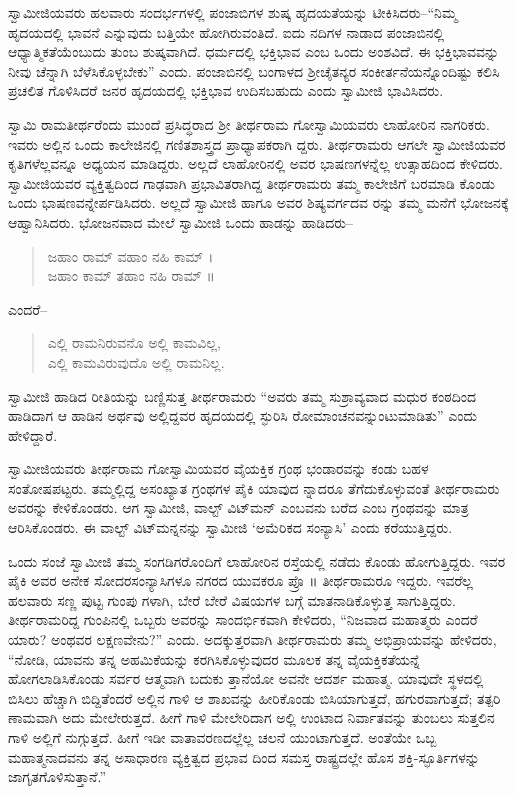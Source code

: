 ಸ್ವಾಮೀಜಿಯವರು ಹಲವಾರು ಸಂದರ್ಭಗಳಲ್ಲಿ ಪಂಜಾಬಿಗಳ ಶುಷ್ಕ ಹೃದಯತೆಯನ್ನು ಟೀಕಿಸಿದರು–“ನಿಮ್ಮ ಹೃದಯದಲ್ಲಿ ಭಾವನೆ ಎನ್ನುವುದು ಬತ್ತಿಯೇ ಹೋಗಿರುವಂತಿದೆ. ಐದು ನದಿಗಳ ನಾಡಾದ ಪಂಜಾಬಿನಲ್ಲಿ ಆಧ್ಯಾತ್ಮಿಕತೆಯೆಂಬುದು ತುಂಬ ಶುಷ್ಕವಾಗಿದೆ. ಧರ್ಮದಲ್ಲಿ ಭಕ್ತಿಭಾವ ಎಂಬ ಒಂದು ಅಂಶವಿದೆ. ಈ ಭಕ್ತಿಭಾವವನ್ನು ನೀವು ಚೆನ್ನಾಗಿ ಬೆಳೆಸಿಕೊಳ್ಳಬೇಕು” ಎಂದು. ಪಂಜಾಬಿನಲ್ಲಿ ಬಂಗಾಳದ ಶ್ರೀಚೈತನ್ಯರ ಸಂಕೀರ್ತನೆಯನ್ನೊಂದಿಷ್ಟು ಕಲಿಸಿ ಪ್ರಚಲಿತ ಗೊಳಿಸಿದರೆ ಜನರ ಹೃದಯದಲ್ಲಿ ಭಕ್ತಿಭಾವ ಉದಿಸಬಹುದು ಎಂದು ಸ್ವಾಮೀಜಿ ಭಾವಿಸಿದರು.

ಸ್ವಾಮಿ ರಾಮತೀರ್ಥರೆಂದು ಮುಂದೆ ಪ್ರಸಿದ್ಧರಾದ ಶ್ರೀ ತೀರ್ಥರಾಮ ಗೋಸ್ವಾಮಿಯವರು ಲಾಹೋರಿನ ನಾಗರಿಕರು. ಇವರು ಅಲ್ಲಿನ ಒಂದು ಕಾಲೇಜಿನಲ್ಲಿ ಗಣಿತಶಾಸ್ತ್ರದ ಪ್ರಾಧ್ಯಾಪಕರಾಗಿ ದ್ದರು. ತೀರ್ಥರಾಮರು ಆಗಲೇ ಸ್ವಾಮೀಜಿಯವರ ಕೃತಿಗಳೆಲ್ಲವನ್ನೂ ಅಧ್ಯಯನ ಮಾಡಿದ್ದರು. ಅಲ್ಲದೆ ಲಾಹೋರಿನಲ್ಲಿ ಅವರ ಭಾಷಣಗಳನ್ನೆಲ್ಲ ಉತ್ಸಾಹದಿಂದ ಕೇಳಿದರು. ಸ್ವಾಮೀಜಿಯವರ ವ್ಯಕ್ತಿತ್ವದಿಂದ ಗಾಢವಾಗಿ ಪ್ರಭಾವಿತರಾಗಿದ್ದ ತೀರ್ಥರಾಮರು ತಮ್ಮ ಕಾಲೇಜಿಗೆ ಬರಮಾಡಿ ಕೊಂಡು ಒಂದು ಭಾಷಣವನ್ನೇರ್ಪಡಿಸಿದರು. ಅಲ್ಲದೆ ಸ್ವಾಮೀಜಿ ಹಾಗೂ ಅವರ ಶಿಷ್ಯವರ್ಗದವ ರನ್ನು ತಮ್ಮ ಮನೆಗೆ ಭೋಜನಕ್ಕೆ ಆಹ್ವಾನಿಸಿದರು. ಭೋಜನವಾದ ಮೇಲೆ ಸ್ವಾಮೀಜಿ ಒಂದು ಹಾಡನ್ನು ಹಾಡಿದರು–

\begin{verse}
ಜಹಾಂ ರಾಮ್ ವಹಾಂ ನಹಿ ಕಾಮ್ ।\\ಜಹಾಂ ಕಾಮ್ ತಹಾಂ ನಹಿ ರಾಮ್ ॥
\end{verse}

\noindent

ಎಂದರೆ–

\begin{verse}
ಎಲ್ಲಿ ರಾಮನಿರುವನೊ ಅಲ್ಲಿ ಕಾಮವಿಲ್ಲ,\\ಎಲ್ಲಿ ಕಾಮವಿರುವುದೊ ಅಲ್ಲಿ ರಾಮನಿಲ್ಲ.
\end{verse}

ಸ್ವಾಮೀಜಿ ಹಾಡಿದ ರೀತಿಯನ್ನು ಬಣ್ಣಿಸುತ್ತ ತೀರ್ಥರಾಮರು “ಅವರು ತಮ್ಮ ಸುಶ್ರಾವ್ಯವಾದ ಮಧುರ ಕಂಠದಿಂದ ಹಾಡಿದಾಗ ಆ ಹಾಡಿನ ಅರ್ಥವು ಅಲ್ಲಿದ್ದವರ ಹೃದಯದಲ್ಲಿ ಸ್ಫುರಿಸಿ ರೋಮಾಂಚನವನ್ನುಂಟುಮಾಡಿತು” ಎಂದು ಹೇಳಿದ್ದಾರೆ.

ಸ್ವಾಮೀಜಿಯವರು ತೀರ್ಥರಾಮ ಗೋಸ್ವಾಮಿಯವರ ವೈಯಕ್ತಿಕ ಗ್ರಂಥ ಭಂಡಾರವನ್ನು ಕಂಡು ಬಹಳ ಸಂತೋಷಪಟ್ಟರು. ತಮ್ಮಲ್ಲಿದ್ದ ಅಸಂಖ್ಯಾತ ಗ್ರಂಥಗಳ ಪೈಕಿ ಯಾವುದ ನ್ನಾದರೂ ತೆಗೆದುಕೊಳ್ಳುವಂತೆ ತೀರ್ಥರಾಮರು ಅವರನ್ನು ಕೇಳಿಕೊಂಡರು. ಆಗ ಸ್ವಾಮೀಜಿ, ವಾಲ್ಟ್ ವಿಟ್​ಮನ್ ಎಂಬವನು ಬರೆದ  ಎಂಬ ಗ್ರಂಥವನ್ನು ಮಾತ್ರ ಆರಿಸಿಕೊಂಡರು. ಈ ವಾಲ್ಟ್ ವಿಟ್​ಮನ್ನನನ್ನು ಸ್ವಾಮೀಜಿ ‘ಅಮೆರಿಕದ ಸಂನ್ಯಾಸಿ’ ಎಂದು ಕರೆಯುತ್ತಿದ್ದರು.

ಒಂದು ಸಂಜೆ ಸ್ವಾಮೀಜಿ ತಮ್ಮ ಸಂಗಡಿಗರೊಂದಿಗೆ ಲಾಹೋರಿನ ರಸ್ತೆಯಲ್ಲಿ ನಡೆದು ಕೊಂಡು ಹೋಗುತ್ತಿದ್ದರು. ಇವರ ಪೈಕಿ ಅವರ ಅನೇಕ ಸೋದರಸಂನ್ಯಾಸಿಗಳೂ ನಗರದ ಯುವಕರೂ ಪ್ರೊ ॥ ತೀರ್ಥರಾಮರೂ ಇದ್ದರು. ಇವರೆಲ್ಲ ಹಲವಾರು ಸಣ್ಣ ಪುಟ್ಟ ಗುಂಪು ಗಳಾಗಿ, ಬೇರೆ ಬೇರೆ ವಿಷಯಗಳ ಬಗ್ಗೆ ಮಾತನಾಡಿಕೊಳ್ಳುತ್ತ ಸಾಗುತ್ತಿದ್ದರು. ತೀರ್ಥರಾಮರಿದ್ದ ಗುಂಪಿನಲ್ಲಿ ಒಬ್ಬರು ಅವರನ್ನು ಸಾಂದರ್ಭಿಕವಾಗಿ ಕೇಳಿದರು, “ನಿಜವಾದ ಮಹಾತ್ಮರು ಎಂದರೆ ಯಾರು? ಅಂಥವರ ಲಕ್ಷಣವೇನು?” ಎಂದು. ಅದಕ್ಕುತ್ತರವಾಗಿ ತೀರ್ಥರಾಮರು ತಮ್ಮ ಅಭಿಪ್ರಾಯವನ್ನು ಹೇಳಿದರು, “ನೋಡಿ, ಯಾವನು ತನ್ನ ಅಹಮಿಕೆಯನ್ನು ಕರಗಿಸಿಕೊಳ್ಳುವುದರ ಮೂಲಕ ತನ್ನ ವೈಯಕ್ತಿಕತೆಯನ್ನೆ ಹೋಗಲಾಡಿಸಿಕೊಂಡು ಸರ್ವರ ಆತ್ಮವಾಗಿ ಬದುಕು ತ್ತಾನೆಯೋ ಅವನೇ ಆದರ್ಶ ಮಹಾತ್ಮ. ಯಾವುದೇ ಸ್ಥಳದಲ್ಲಿ ಬಿಸಿಲು ಹೆಚ್ಚಾಗಿ ಬಿದ್ದಿತೆಂದರೆ ಅಲ್ಲಿನ ಗಾಳಿ ಆ ಶಾಖವನ್ನು ಹೀರಿಕೊಂಡು ಬಿಸಿಯಾಗುತ್ತದೆ, ಹಗುರವಾಗುತ್ತದೆ; ತತ್ಪರಿ ಣಾಮವಾಗಿ ಅದು ಮೇಲೇರುತ್ತದೆ. ಹೀಗೆ ಗಾಳಿ ಮೇಲೇರಿದಾಗ ಅಲ್ಲಿ ಉಂಟಾದ ನಿರ್ವಾತವನ್ನು ತುಂಬಲು ಸುತ್ತಲಿನ ಗಾಳಿ ಅಲ್ಲಿಗೆ ನುಗ್ಗುತ್ತದೆ. ಹೀಗೆ ಇಡೀ ವಾತಾವರಣದಲ್ಲೆಲ್ಲ ಚಲನೆ ಯುಂಟಾಗುತ್ತದೆ. ಅಂತೆಯೇ ಒಬ್ಬ ಮಹಾತ್ಮನಾದವನು ತನ್ನ ಅಸಾಧಾರಣ ವ್ಯಕ್ತಿತ್ವದ ಪ್ರಭಾವ ದಿಂದ ಸಮಸ್ತ ರಾಷ್ಟ್ರದಲ್ಲೇ ಹೊಸ ಶಕ್ತಿ-ಸ್ಫೂರ್ತಿಗಳನ್ನು ಜಾಗೃತಗೊಳಿಸುತ್ತಾನೆ.”

